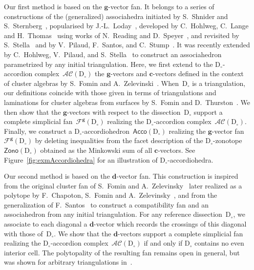\documentclass{amsart}
\theoremstyle{definition}
\renewcommand{\b}[1]{\mathbf{#1}} %
\newcommand{\Acco}{\mathsf{Acco}} %
\newcommand{\Zono}{\mathsf{Zono}} %
\newcommand{\fref}[1]{Figure~\ref{#1}} %
\newcommand{\accordionComplex}{\mathcal{AC}} %
\newcommand{\dissection}{\mathrm{D}} %
\newcommand{\gvectorFan}{\mathcal{F}^\mathbf{g}} %
\begin{document}
Our first method is based on the $\b{g}$-vector fan. It belongs to a series of constructions of the (generalized) associahedra initiated by S.~Shnider and S.~Sternberg~\cite{ShniderSternberg}, popularised by \mbox{J.-L.~Loday~\cite{Loday}}, developed by C.~Hohlweg, C.~Lange and H.~Thomas~\cite{HohlwegLange, HohlwegLangeThomas} using works of N.~Reading and D.~Speyer~\cite{Reading-CambrianLattices, Reading-sortableElements, ReadingSpeyer}, and revisited by S.~Stella~\cite{Stella} and by V.~Pilaud, F.~Santos, and C.~Stump~\cite{PilaudSantos-brickPolytope, PilaudStump-brickPolytope}. It was recently extended by C.~Hohlweg, V.~Pilaud, and S.~Stella~\cite{HohlwegPilaudStella} to construct an associahedron parametrized by any initial triangulation. Here, we first extend to the $\dissection_\circ$-accordion complex~$\accordionComplex(\dissection_\circ)$ the $\b{g}$-vectors and $\b{c}$-vectors defined in the context of cluster algebras by S.~Fomin and A.~Zelevinski~\cite{FominZelevinsky-ClusterAlgebrasIV}. When~$\dissection_\circ$ is a triangulation, our definitions coincide with those given in terms of triangulations and laminations for cluster algebras from surfaces by S.~Fomin and D.~Thurston~\cite{FominThurston}. We then show that the $\b{g}$-vectors with respect to the dissection~$\dissection_\circ$ support a complete simplicial fan~$\gvectorFan(\dissection_\circ)$ realizing the $\dissection_\circ$-accordion complex~$\accordionComplex(\dissection_\circ)$. Finally, we construct a $\dissection_\circ$-accordiohedron~$\Acco(\dissection_\circ)$ realizing the $\b{g}$-vector fan~$\gvectorFan(\dissection_\circ)$ by deleting inequalities from the facet description of the \mbox{$\dissection_\circ$-zonotope}~$\Zono(\dissection_\circ)$ obtained as the Minkowski sum of all $\b{c}$-vectors. See \fref{fig:exmAccordiohedra} for an illustration of $\dissection_\circ$-accordiohedra.

Our second method is based on the $\b{d}$-vector fan. This construction is inspired from the original cluster fan of S.~Fomin and A.~Zelevinsky~\cite{FominZelevinsky-ClusterAlgebrasII} later realized as a polytope by F.~Chapoton, S.~Fomin and A.~Zelevinsky~\cite{ChapotonFominZelevinsky}, and from the generalization of F.~Santos~\cite{CeballosSantosZiegler} to construct a compatibility fan and an associahedron from any initial triangulation. For any reference dissection~$\dissection_\circ$, we associate to each diagonal a $\b{d}$-vector which records the crossings of this diagonal with those of~$\dissection_\circ$. We show that the $\b{d}$-vectors support a complete simplicial fan realizing the $\dissection_\circ$-accordion complex~$\accordionComplex(\dissection_\circ)$ if and only if $\dissection_\circ$ contains no even interior cell. The polytopality of the resulting fan remains open in general, but was shown for arbitrary triangulations in~\cite{CeballosSantosZiegler}.
\end{document}
